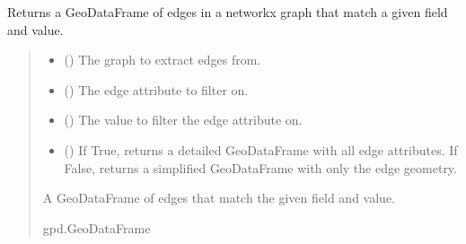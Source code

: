 \documentclass[letterpaper,10pt,english]{sphinxmanual}
\begin{document}
\begin{fulllineitems}
\label{\detokenize{pysewer:pysewer.helper.get_edge_gdf}}
\pysigstartsignatures
{}
\pysigstopsignatures
\sphinxAtStartPar
Returns a GeoDataFrame of edges in a networkx graph that match a given field and value.
\begin{quote}\begin{description}
\begin{itemize}
\item {} 
\sphinxAtStartPar
{} () \textendash{} The graph to extract edges from.

\item {} 
\sphinxAtStartPar
{} (\sphinxstyleliteralemphasis{\sphinxupquote{, }}) \textendash{} The edge attribute to filter on.

\item {} 
\sphinxAtStartPar
{} (\sphinxstyleliteralemphasis{\sphinxupquote{, }}) \textendash{} The value to filter the edge attribute on.

\item {} 
\sphinxAtStartPar
{} (\sphinxstyleliteralemphasis{\sphinxupquote{, }}) \textendash{} If True, returns a detailed GeoDataFrame with all edge attributes. If False, returns a simplified GeoDataFrame with only the edge geometry.

\end{itemize}

\sphinxAtStartPar
A GeoDataFrame of edges that match the given field and value.

\sphinxAtStartPar
gpd.GeoDataFrame

\end{description}\end{quote}

\end{fulllineitems}
\end{document}
